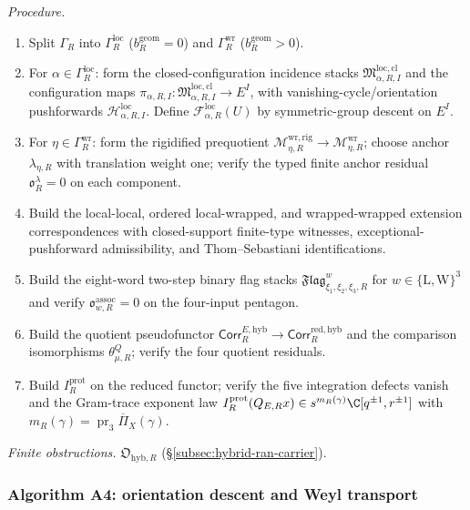 \textit{Procedure.}
\begin{enumerate}
\item Split $\Gamma_R$ into $\Gamma_R^{\mathrm{loc}}$
($b_R^{\mathrm{geom}}=0$) and $\Gamma_R^{\mathrm{wr}}$
($b_R^{\mathrm{geom}}>0$).
\item For $\alpha\in\Gamma_R^{\mathrm{loc}}$: form the
closed-configuration incidence stacks
$\mathfrak M_{\alpha,R,I}^{\mathrm{loc,cl}}$ and the configuration
maps $\pi_{\alpha,R,I}:\mathfrak M_{\alpha,R,I}^{\mathrm{loc,cl}}
\to E^I$, with vanishing-cycle/orientation pushforwards
$\mathscr H_{\alpha,R,I}^{\mathrm{loc}}$.  Define
$\mathcal F_{\alpha,R}^{\mathrm{loc}}(U)$ by symmetric-group descent
on $E^I$.
\item For $\eta\in\Gamma_R^{\mathrm{wr}}$: form the rigidified
prequotient $\mathcal M_{\eta,R}^{\mathrm{wr,rig}}\to
\mathcal M_{\eta,R}^{\mathrm{wr}}$; choose anchor
$\lambda_{\eta,R}$ with translation weight one; verify the typed
finite anchor residual $\mathfrak o^\lambda_R=0$ on each component.
\item Build the local-local, ordered local-wrapped, and
wrapped-wrapped extension correspondences with closed-support
finite-type witnesses, exceptional-pushforward admissibility, and
Thom--Sebastiani identifications.
\item Build the eight-word two-step binary flag stacks
$\mathfrak{Flag}^w_{\xi_1,\xi_2,\xi_3,R}$ for
$w\in\{\mathrm L,\mathrm W\}^3$ and verify
$\mathfrak o^{\mathrm{assoc}}_{w,R}=0$ on the four-input pentagon.
\item Build the quotient pseudofunctor
$\mathsf{Corr}^{E,\mathrm{hyb}}_R\to
\mathsf{Corr}^{\mathrm{red},\mathrm{hyb}}_R$ and the comparison
isomorphisms $\theta^Q_{\mu,R}$; verify the four quotient residuals.
\item Build $I_R^{\mathrm{prot}}$ on the reduced functor; verify the
five integration defects vanish and the Gram-trace exponent law
$I_R^{\mathrm{prot}}(Q_{E,R}x)\in s^{m_R(\gamma)}\C[q^{\pm1},r^{\pm1}]$
with $m_R(\gamma)=\operatorname{pr}_3\overline\Pi_X(\gamma)$.
\end{enumerate}

\textit{Finite obstructions.}  $\mathfrak O_{\mathrm{hyb},R}$
(\S\ref{subsec:hybrid-ran-carrier}).

\subsubsection*{Algorithm A4: orientation descent and Weyl transport}

